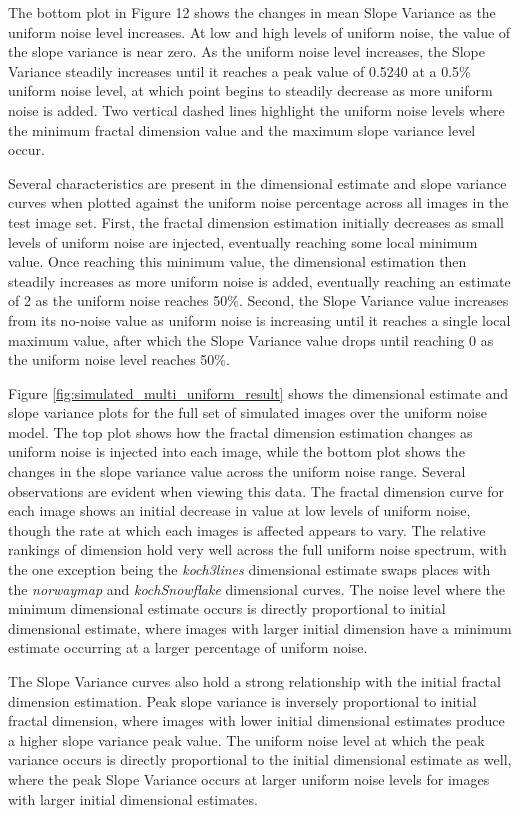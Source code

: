 \documentclass[12pt, oneside]{book}
\begin{document}
The bottom plot in Figure 12 shows the changes in mean Slope Variance as the uniform noise level increases.  At low and high levels of uniform noise, the value of the slope variance is near zero.  As the uniform noise level increases, the Slope Variance steadily increases until it reaches a peak value of 0.5240 at a 0.5\% uniform noise level, at which point begins to steadily decrease as more uniform noise is added.  Two vertical dashed lines highlight the uniform noise levels where the minimum fractal dimension value and the maximum slope variance level occur.

Several characteristics are present in the dimensional estimate and slope variance curves when plotted against the uniform noise percentage across all images in the test image set.  First, the fractal dimension estimation initially decreases as small levels of uniform noise are injected, eventually reaching some local minimum value.  Once reaching this minimum value, the dimensional estimation then steadily increases as more uniform noise is added, eventually reaching an estimate of 2 as the uniform noise reaches 50\%.  Second, the Slope Variance value increases from its no-noise value as uniform noise is increasing until it reaches a single local maximum value, after which the Slope Variance value drops until reaching 0 as the uniform noise level reaches 50\%.  

Figure \ref{fig:simulated_multi_uniform_result} shows the dimensional estimate and slope variance plots for the full set of simulated images over the uniform noise model.  The top plot shows how the fractal dimension estimation changes as uniform noise is injected into each image, while the bottom plot shows the changes in the slope variance value across the uniform noise range.  Several observations are evident when viewing this data.  The fractal dimension curve for each image shows an initial decrease in value at low levels of uniform noise, though the rate at which each images is affected appears to vary.  The relative rankings of dimension hold very well across the full uniform noise spectrum, with the one exception being the \textit{koch3lines} dimensional estimate swaps places with the \textit{norwaymap} and \textit{kochSnowflake} dimensional curves.  The noise level where the minimum dimensional estimate occurs is directly proportional to initial dimensional estimate, where images with larger initial dimension have a minimum estimate occurring at a larger percentage of uniform noise.

The Slope Variance curves also hold a strong relationship with the initial fractal dimension estimation.  Peak slope variance is inversely proportional to initial fractal dimension, where images with lower initial dimensional estimates produce a higher slope variance peak value.  The uniform noise level at which the peak variance occurs is directly proportional to the initial dimensional estimate as well, where the peak Slope Variance occurs at larger uniform noise levels for images with larger initial dimensional estimates.
\end{document}
